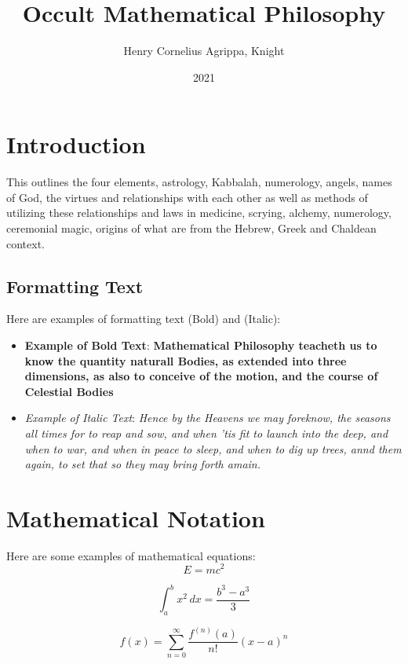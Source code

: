 \documentclass{article}
\title{Occult Mathematical Philosophy}
\author{Henry Cornelius Agrippa, Knight}
\date{2021}
\begin{document}
\maketitle

\tableofcontents

\section{Introduction}
This outlines the four elements, astrology, Kabbalah, numerology, angels, names of God, the virtues and relationships with each other as well as methods of utilizing these relationships and laws in medicine, scrying, alchemy, numerology, ceremonial magic, origins of what are from the Hebrew, Greek and Chaldean context.

\subsection{Formatting Text}
Here are examples of formatting text (Bold) and (Italic):
\begin{itemize}
    \item \textbf{Example of Bold Text}: \textbf{Mathematical Philosophy teacheth us to know the quantity naturall Bodies, as extended into three dimensions, as also to conceive of the motion,
    and the course of Celestial Bodies}
    \item \textit{Example of Italic Text}: \textit{Hence by the Heavens we may foreknow, the seasons all times for to reap and sow, and when 'tis fit to launch into the deep, and when to war, and when in peace to sleep, and when to dig up trees, annd them again, to set that so they may bring forth amain.}
\end{itemize}

\section{Mathematical Notation}
Here are some examples of mathematical equations:
\begin{equation}
    E = mc^2
\end{equation}

\begin{equation}
    \int_{a}^{b} x^2 \, dx = \frac{b^3 - a^3}{3}
\end{equation}

\begin{equation}
    f(x) = \sum_{n=0}^{\infty} \frac{f^{(n)}(a)}{n!}(x - a)^n
\end{equation}
\end{document}
